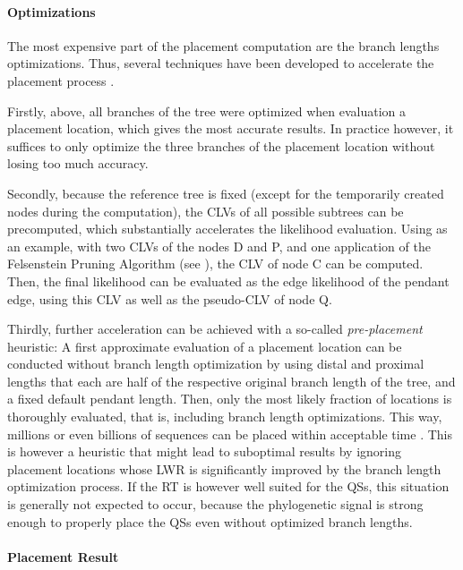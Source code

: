 \paragraph{Optimizations}
\label{ch:Foundations:sec:PhylogeneticPlacement:sub:PipelineAndComputation:par:Optimizations}

The most expensive part of the placement computation are the branch lengths optimizations.
Thus, several techniques have been developed to accelerate the placement process \cite{Barbera2018}.

Firstly, above, all branches of the tree were optimized when evaluation a placement location,
which gives the most accurate results.
In practice however, it suffices to only optimize the three branches of the placement location
without losing too much accuracy.

Secondly, because the reference tree is fixed (except for the temporarily created nodes during the computation),
the CLVs of all possible subtrees can be precomputed,
which substantially accelerates the likelihood evaluation.
Using  as an example,
with two CLVs of the nodes {\sffamily D} and {\sffamily P}, and one application of the Felsenstein Pruning Algorithm
(see ),
the CLV of node {\sffamily C} can be computed.
Then, the final likelihood can be evaluated as the edge likelihood of the pendant edge,
using this CLV as well as the pseudo-CLV of node {\sffamily Q}.

Thirdly, further acceleration can be achieved with a so-called \emph{pre-placement} heuristic:
A first approximate evaluation of a placement location can be conducted without branch length optimization by using
distal and proximal lengths that each are half of the respective original branch length of the tree,
and a fixed default pendant length.
Then, only the most likely fraction of locations is thoroughly evaluated, that is, including branch length optimizations.
This way, millions or even billions of sequences can be placed within acceptable time \cite{Barbera2018}.
This is however a heuristic that might lead to suboptimal results by ignoring placement locations
whose \ac{LWR} is significantly improved by the branch length optimization process.
If the \ac{RT} is however well suited for the \acp{QS}, this situation is generally not expected to occur,
because the phylogenetic signal is strong enough to properly place the \acp{QS} even without optimized branch lengths.

\paragraph{Placement Result}
\label{ch:Foundations:sec:PhylogeneticPlacement:sub:PipelineAndComputation:par:PlacementResults}

